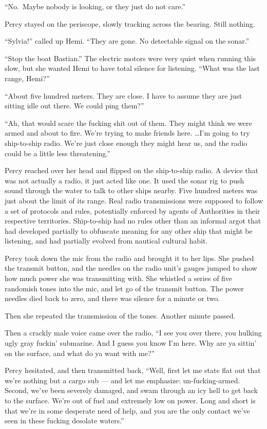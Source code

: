 \documentclass[
]{scrbook}
\begin{document}
``No.~Maybe nobody is looking, or they just do not care.''

Percy stayed on the periscope, slowly tracking across the bearing. Still
nothing.

``Sylvia!'' called up Hemi. ``They are gone. No detectable signal on the
sonar.''

``Stop the boat Bastian.'' The electric motors were very quiet when
running this slow, but she wanted Hemi to have total silence for
listening. ``What was the last range, Hemi?''

``About five hundred meters. They are close. I have to assume they are
just sitting idle out there. We could ping them?''

``Ah, that would scare the fucking shit out of them. They might think we
were armed and about to fire. We're trying to make friends here.
\ldots I'm going to try ship-to-ship radio. We're just close enough they
might hear us, and the radio could be a little less threatening.''

Percy reached over her head and flipped on the ship-to-ship radio. A
device that was not actually a radio, it just acted like one. It used
the sonar rig to push sound through the water to talk to other ships
nearby. Five hundred meters was just about the limit of its range. Real
radio transmissions were supposed to follow a set of protocols and
rules, potentially enforced by agents of Authorities in their respective
territories. Ship-to-ship had no rules other than an informal argot that
had developed partially to obfuscate meaning for any other ship that
might be listening, and had partially evolved from nautical cultural
habit.

Percy took down the mic from the radio and brought it to her lips. She
pushed the transmit button, and the needles on the radio unit's gauges
jumped to show how much power she was transmitting with. She whistled a
series of five randomish tones into the mic, and let go of the transmit
button. The power needles died back to zero, and there was silence for a
minute or two.

Then she repeated the transmission of the tones. Another minute passed.

Then a crackly male voice came over the radio, ``I see you over there,
you hulking ugly gray fuckin' submarine. And I guess you know I'm here.
Why are ya sittin' on the surface, and what do ya want with me?''

Percy hesitated, and then transmitted back, ``Well, first let me state
flat out that we're nothing but a cargo sub --- and let me emphasize:
un-fucking-armed. Second, we've been severely damaged, and swam through
an icy hell to get back to the surface. We're out of fuel and extremely
low on power. Long and short is that we're in some desperate need of
help, and you are the only contact we've seen in these fucking desolate
waters.''
\end{document}
